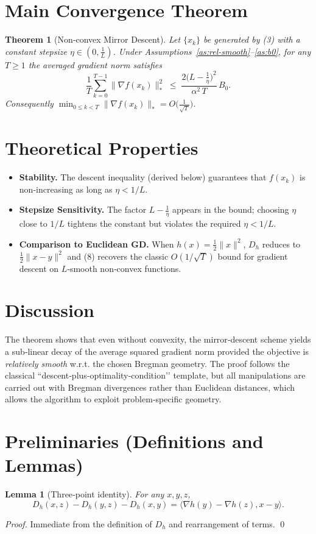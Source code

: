 \documentclass[11pt]{article}
\newtheorem{theorem}{Theorem}
\newtheorem{lemma}{Lemma}
\newcommand{\inner}[2]{\langle #1,#2\rangle}
\newcommand{\grad}{\nabla}
\begin{document}
\section*{Main Convergence Theorem}
\begin{theorem}[Non‑convex Mirror Descent]\label{thm:md}
Let $\{x_{k}\}$ be generated by (3) with a constant stepsize $\eta\in(0,\frac{1}{L})$. Under Assumptions~\ref{as:rel-smooth}–\ref{as:b0}, for any $T\ge1$ the averaged gradient norm satisfies
\[
\frac{1}{T}\sum_{k=0}^{T-1}\|\grad f(x_{k})\|_{*}^{2}
\;\le\;
\frac{2\big(L-\tfrac{1}{\eta}\big)^{2}}{\alpha^{2}\,T}\,B_{0}. \tag{8}
\]
Consequently $\min_{0\le k<T}\|\grad f(x_{k})\|_{*}=O\!\big(\tfrac{1}{\sqrt{T}}\big)$. 
\end{theorem}

\section*{Theoretical Properties}
\begin{itemize}
\item \textbf{Stability.} The descent inequality (derived below) guarantees that $f(x_{k})$ is non‑increasing as long as $\eta<1/L$.
\item \textbf{Stepsize Sensitivity.} The factor $L-\tfrac{1}{\eta}$ appears in the bound; choosing $\eta$ close to $1/L$ tightens the constant but violates the required $\eta<1/L$.
\item \textbf{Comparison to Euclidean GD.} When $h(x)=\tfrac12\|x\|^{2}$, $D_{h}$ reduces to $\tfrac12\|x-y\|^{2}$ and (8) recovers the classic $O(1/\sqrt{T})$ bound for gradient descent on $L$‑smooth non‑convex functions.
\end{itemize}

\section*{Discussion}
The theorem shows that even without convexity, the mirror‑descent scheme yields a sub‑linear decay of the average squared gradient norm provided the objective is \emph{relatively smooth} w.r.t. the chosen Bregman geometry. The proof follows the classical “descent‑plus‑optimality‑condition’’ template, but all manipulations are carried out with Bregman divergences rather than Euclidean distances, which allows the algorithm to exploit problem‑specific geometry.

\newpage
\section*{Preliminaries (Definitions and Lemmas)}
\begin{lemma}[Three‑point identity]\label{lem:3pt}
For any $x,y,z$,
\[
D_{h}(x,z)-D_{h}(y,z)-D_{h}(x,y)=\inner{\grad h(y)-\grad h(z)}{x-y}. \tag{9}
\]
\end{lemma}
\begin{proof}
Immediate from the definition of $D_{h}$ and rearrangement of terms. \hfill\qed
\end{proof}
\end{document}
